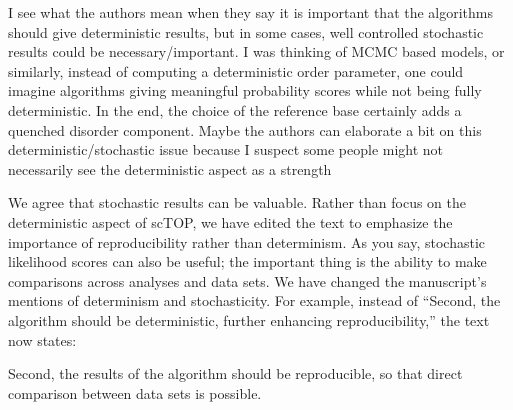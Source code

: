 \documentclass[12pt,american]{scrartcl}
\begin{document}
\begin{revcomment}
	I see what the authors mean when they say it is important that the algorithms should give deterministic results, but in some cases, well controlled stochastic results could be necessary/important. I was thinking of MCMC based models, or similarly, instead of computing a deterministic order parameter, one could imagine algorithms giving meaningful probability scores while not being fully deterministic. In the end, the choice of the reference base certainly adds a quenched disorder component. Maybe the authors can elaborate a bit on this deterministic/stochastic issue because I suspect some people might not necessarily see the deterministic aspect as a strength 
\end{revcomment}
\begin{revresponse}
    We agree that stochastic results can be valuable. Rather than focus on the deterministic aspect of scTOP, we have edited the text to emphasize the importance of reproducibility rather than determinism. As you say, stochastic likelihood scores can also be useful; the important thing is the ability to make comparisons across analyses and data sets. We have changed the manuscript's mentions of determinism and stochasticity. For example, instead of ``Second, the algorithm should be deterministic, further enhancing reproducibility,'' the text now states:

    \begin{changes}
        Second, the results of the algorithm should be reproducible, so that direct comparison between data sets is possible.
    \end{changes}
\end{revresponse}
\end{document}

